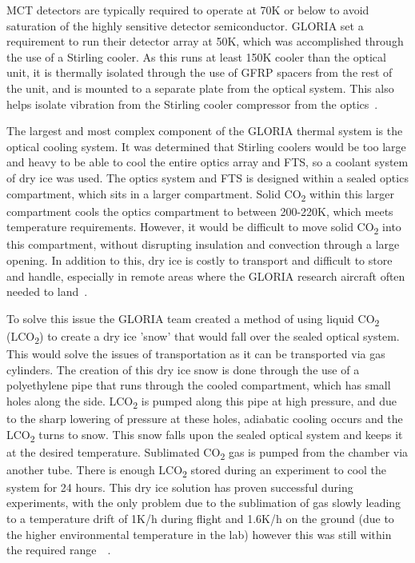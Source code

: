 MCT detectors are typically required to operate at 70K or below to avoid saturation of the highly sensitive detector semiconductor. GLORIA set a requirement to run their detector array at 50K, which was accomplished through the use of a Stirling cooler. As this runs at least 150K cooler than the optical unit, it is thermally isolated through the use of GFRP spacers from the rest of the unit, and is mounted to a separate plate from the optical system. This also helps isolate vibration from the Stirling cooler compressor from the optics~\citep{GLORIA_thermalmech}.

The largest and most complex component of the GLORIA thermal system is the optical cooling system. It was determined that Stirling coolers would be too large and heavy to be able to cool the entire optics array and FTS, so a coolant system of dry ice was used. The optics system and FTS is designed within a sealed optics compartment, which sits in a larger compartment. Solid CO\textsubscript{2} within this larger compartment cools the optics compartment to between 200-220K, which meets temperature requirements. However, it would be difficult to move solid CO\textsubscript{2} into this compartment, without disrupting insulation and convection through a large opening. In addition to this, dry ice is costly to transport and difficult to store and handle, especially in remote areas where the GLORIA research aircraft often needed to land~\citep{GLORIA_thermalmech}.

To solve this issue the GLORIA team created a method of using liquid CO\textsubscript{2} (LCO\textsubscript{2}) to create a dry ice 'snow' that would fall over the sealed optical system. This would solve the issues of transportation as it can be transported via gas cylinders. The creation of this dry ice snow is done through the use of a polyethylene pipe that runs through the cooled compartment, which has small holes along the side. LCO\textsubscript{2} is pumped along this pipe at high pressure, and due to the sharp lowering of pressure at these holes, adiabatic cooling occurs and the LCO\textsubscript{2} turns to snow. This snow falls upon the sealed optical system and keeps it at the desired temperature. Sublimated CO\textsubscript{2} gas is pumped from the chamber via another tube. There is enough LCO\textsubscript{2} stored during an experiment to cool the system for 24 hours. This dry ice solution has proven successful during experiments, with the only problem due to the sublimation of gas slowly leading to a temperature drift of 1K/h during flight and 1.6K/h on the ground (due to the higher environmental temperature in the lab) however this was still within the required range~\citep{GLORIA_concept}~\citep{GLORIA_thermalmech}.

